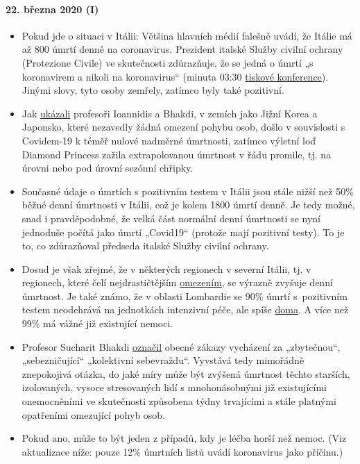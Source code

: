 \hypertarget{22-bux159ezna-2020-i}{%
\paragraph{22. března 2020 (I)}\label{22-bux159ezna-2020-i}}

\begin{itemize}
\tightlist
\item
  Pokud jde o situaci v Itálii: Většina hlavních médií falešně uvádí, že
  Itálie má až 800 úmrtí denně na coronavirus. Prezident italské Služby
  civilní ochrany (Protezione Civile) ve skutečnosti zdůrazňuje, že se
  jedná o úmrtí „s koronavirem a nikoli na koronavirus`` (minuta 03:30
  \href{https://youtu.be/0M4kbPDHGR0?t=210}{tiskové konference}). Jinými
  slovy, tyto osoby zemřely, zatímco byly také pozitivní.
\item
  Jak
  \href{https://www.statnews.com/2020/03/17/a-fiasco-in-the-making-as-the-coronavirus-pandemic-takes-hold-we-are-making-decisions-without-reliable-data/}{ukázali}
  profesoři Ioannidis a Bhakdi, v zemích jako Jižní Korea a Japonsko,
  které nezavedly žádná omezení pohybu osob, došlo v souvislosti s
  Covidem-19 k téměř nulové nadměrné úmrtnosti, zatímco výletní loď
  Diamond Princess zažila extrapolovanou úmrtnost v řádu promile, tj. na
  úrovni nebo pod úrovní sezónní chřipky.
\item
  Současné údaje o úmrtích s pozitivním testem v Itálii jsou stále nižší
  než 50\% běžné denní úmrtnosti v Itálii, což je kolem 1800 úmrtí
  denně. Je tedy možné, snad i pravděpodobné, že velká část normální
  denní úmrtnosti se nyní jednoduše počítá jako úmrtí „Covid19``
  (protože mají pozitivní testy). To je to, co zdůrazňoval předseda
  italské Služby civilní ochrany.
\item
  Dosud je však zřejmé, že v některých regionech v severní Itálii, tj. v
  regionech, které čelí nejdrastičtějším
  \href{https://en.wikipedia.org/wiki/2020_Italy_coronavirus_lockdown}{omezením},
  se výrazně zvyšuje denní úmrtnost. Je také známo, že v oblasti
  Lombardie se 90\% úmrtí s~pozitivním testem neodehrává na jednotkách
  intenzivní péče, ale spíše
  \href{https://www.tgcom24.mediaset.it/cronaca/coronavirus-in-lombardia-9-morti-su-10-mai-giunti-in-terapia-intensiva_16362350-202002a.shtml}{doma}.
  A více než 99\% má vážné již existující nemoci.
\item
  Profesor Sucharit Bhakdi
  \href{https://www.youtube.com/watch?v=JBB9bA-gXL4}{označil} obecné
  zákazy vycházení za „zbytečnou``, „sebezničující`` „kolektivní
  sebevraždu``. Vyvstává tedy mimořádně znepokojivá otázka, do jaké míry
  může být zvýšená úmrtnost těchto starších, izolovaných, vysoce
  stresovaných lidí s mnohonásobnými již existujícími onemocněními ve
  skutečnosti způsobena týdny trvajícími a stále platnými opatřeními
  omezující pohyb osob.
\item
  Pokud ano, může to být jeden z případů, kdy je léčba horší než nemoc.
  (Viz aktualizace níže: pouze 12\% úmrtních listů uvádí koronavirus
  jako příčinu.)
\end{itemize}

